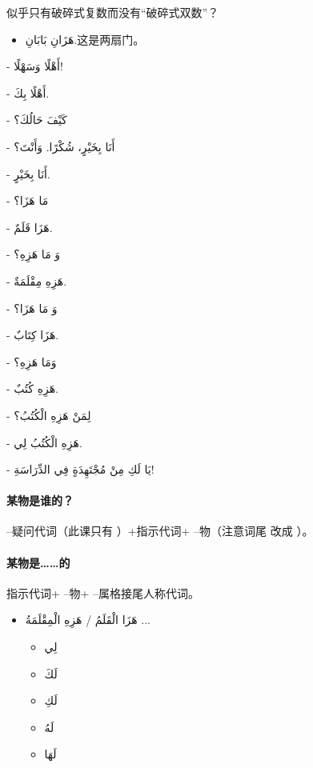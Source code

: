 \begin{note}
    似乎只有破碎式复数而没有``破碎式双数''？
    \begin{itemize}
        \item \ac{هَزَانِ بَابَانِ.}{这是两扇门。}
    \end{itemize}
\end{note}

\begin{Arabic}
    - أَهْلًا وَسَهْلًا!

    - أَهْلًا بِكَ.

    - كَيْفَ حَالُكَ؟

    - أَنَا بِخَيْرٍ، شُكْرًا. وَأَنْتَ؟

    - أَنَا بِخَيْرٍ.

    - مَا هَزَا؟

    - هَزَا قَلَمٌ.

    - وَ مَا هَزِهِ؟

    - هَزِهِ مِقْلَمَةٌ.

    - وَ مَا هَزَا؟

    - هَزَا كِتَابٌ.

    - وَمَا هَزِهِ؟

    - هَزِهِ كُتُبٌ.

    - لِمَنْ هَزِهِ الْكُتُبُ؟

    - هَزِهِ الْكُتُبُ لِي.

    - يَا لَكِ مِنْ مُجْتَهِدَةٍ فِي الدِّرَاسَةِ!
\end{Arabic}

\paragraph{某物是谁的？} --疑问代词（此课只有 ）+指示代词+ --物（注意词尾  改成 ）。

\paragraph{某物是……的} 指示代词+ --物+ --属格接尾人称代词。

\begin{Arabic}
    \begin{itemize}
        \item هَزَا الْقَلَمُ / هَزِهِ الْمِقْلَمَةُ ...
        \begin{itemize}[label=\crm{--}]
            \item لِي
            \item لَكَ
            \item لَكِ
            \item لَهُ
            \item لَهَا
        \end{itemize}
    \end{itemize}
\end{Arabic}

